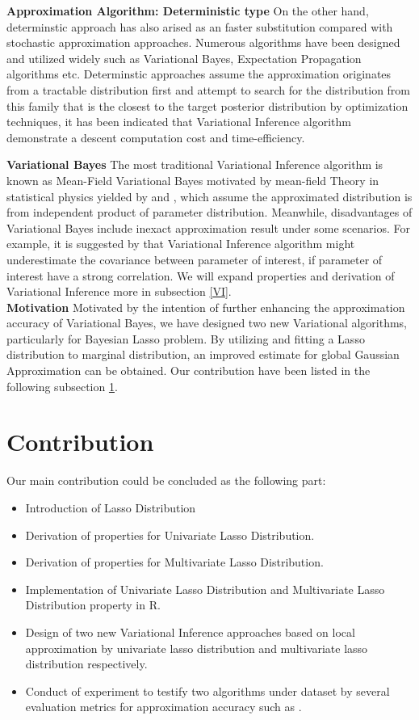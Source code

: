 \textbf{Approximation Algorithm: Deterministic type}
On the other hand, determinstic approach has also arised as an faster substitution compared with stochastic approximation approaches. Numerous algorithms have been designed and utilized widely such as Variational Bayes, Expectation Propagation algorithms etc. Determinstic approaches assume the approximation originates from a tractable distribution first and attempt to search for the distribution from this family that is the closest to the target posterior distribution by optimization techniques, it has been indicated that Variational Inference algorithm demonstrate a descent computation cost and time-efficiency. 

\textbf{Variational Bayes}
The most traditional Variational Inference algorithm is known as Mean-Field Variational Bayes motivated by mean-field Theory in statistical physics yielded by 
\cite{jordan_ghahramani_jaakkola_saul_1998} and \cite{attias_1999}, which assume the approximated distribution is from independent product of parameter distribution.
Meanwhile, disadvantages of Variational Bayes include inexact approximation result under some scenarios. For example, it is suggested by \cite{bishop_2006} that Variational Inference algorithm might underestimate the covariance between parameter of interest, if parameter of interest have a strong correlation. We will expand properties and derivation of Variational Inference more in subsection \ref{VI}.\\

\textbf{Motivation}
Motivated by the intention of further enhancing the approximation accuracy of Variational Bayes, we have designed two new Variational algorithms, particularly for Bayesian Lasso problem. By utilizing and fitting a Lasso distribution to marginal distribution, an improved estimate for global Gaussian Approximation can be obtained. Our contribution have been listed in the following subsection \ref{cont}.\\



\section{Contribution}
\label{cont}
Our main contribution could be concluded as the following part:
\begin{itemize}
	\item Introduction of Lasso Distribution
	\item Derivation of properties for Univariate Lasso Distribution.
	\item Derivation of properties for Multivariate Lasso Distribution.
	\item Implementation of Univariate Lasso Distribution and Multivariate Lasso Distribution property in R.
	\item Design of two new Variational Inference approaches based on local approximation by univariate lasso distribution and multivariate lasso distribution respectively.
	\item Conduct of experiment to testify two algorithms under  dataset by several evaluation metrics for approximation accuracy such as .
\end{itemize}



